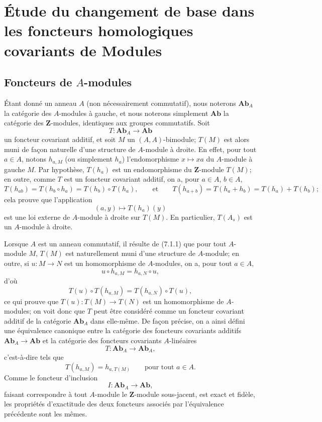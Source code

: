 \section{Étude du changement de base dans les foncteurs homologiques covariants de Modules}
\label{section:III.7.fr}

\subsection{Foncteurs de $A$-modules}
\label{subsection:III.7.1.fr}

\begin{env}[7.1.1]
Étant donné un anneau $A$ (non nécessairement commutatif), nous noterons
$\mathbf{Ab}_A$ la catégorie des $A$-modules à gauche, et nous noterons
simplement $\mathbf{Ab}$ la catégorie des $\mathbf Z$-modules, identiques aux
groupes commutatifs. Soit
\[
  T:\mathbf{Ab}_A\longrightarrow\mathbf{Ab}
\]
un foncteur covariant additif, et soit $M$ un $(A,A)$-bimodule; $T(M)$ est
alors muni de façon naturelle d'une structure de $A$-module à droite. En
effet, pour tout $a\in A$, notons $h_{a,M}$ (ou simplement $h_a$)
l'endomorphisme $x\mapsto xa$ du $A$-module à gauche $M$. Par hypothèse,
$T(h_a)$ est un endomorphisme du $\mathbf Z$-module $T(M)$; en outre, comme
$T$ est un foncteur covariant additif, on a, pour $a\in A$, $b\in A$,
\[
  T(h_{ab})
  =
  T(h_b\circ h_a)
  =
  T(h_b)\circ T(h_a),
  \qquad\text{et}\qquad
  T(h_{a+b})
  =
  T(h_a+h_b)
  =
  T(h_a)+T(h_b);
\]
cela prouve que l'application
\[
  (a,y)\longmapsto T(h_a)(y)
\]
est une loi externe de $A$-module à droite sur $T(M)$. En particulier,
$T(A_s)$ est un $A$-module à droite.
\end{env}

\begin{env}[7.1.2]
Lorsque $A$ est un anneau commutatif, il résulte de (7.1.1) que pour tout
$A$-module $M$, $T(M)$ est naturellement muni d'une structure de $A$-module;
en outre, si $u:M\to N$ est un homomorphisme de $A$-modules, on a, pour tout
$a\in A$,
\[
  u\circ h_{a,M}=h_{a,N}\circ u,
\]
d'où
\[
  T(u)\circ T(h_{a,M})
  =
  T(h_{a,N})\circ T(u),
\]
ce qui prouve que $T(u):T(M)\to T(N)$ est un homomorphisme de $A$-modules; on
voit donc que $T$ peut être considéré comme un foncteur covariant additif de
la catégorie $\mathbf{Ab}_A$ dans elle-même. De façon précise, on a ainsi
défini une équivalence canonique entre la catégorie des foncteurs covariants
additifs $\mathbf{Ab}_A\to\mathbf{Ab}$ et la catégorie des foncteurs
covariants $A$-linéaires
\[
  T:\mathbf{Ab}_A\longrightarrow\mathbf{Ab}_A,
\]
c'est-à-dire tels que
\[
  T(h_{a,M})=h_{a,T(M)}
  \qquad\text{pour tout }a\in A.
\]
Comme le foncteur d'inclusion
\[
  I:\mathbf{Ab}_A\longrightarrow\mathbf{Ab},
\]
faisant correspondre à tout $A$-module le $\mathbf Z$-module sous-jacent, est
exact et fidèle, les propriétés d'exactitude des deux foncteurs associés par
l'équivalence précédente sont les mêmes.
\end{env}

